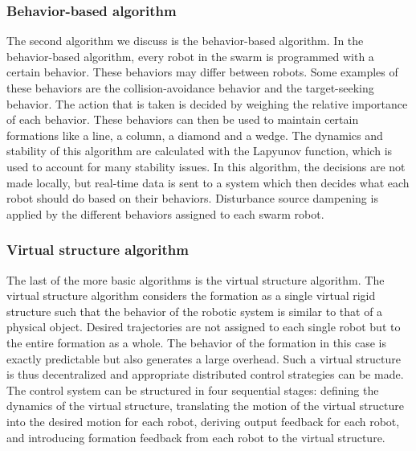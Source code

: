 \subsubsection{Behavior-based algorithm}
The second algorithm we discuss is the behavior-based algorithm. 
In the behavior-based algorithm, every robot in the swarm is programmed with a certain behavior. 
These behaviors may differ between robots.
Some examples of these behaviors are the collision-avoidance behavior and the target-seeking behavior. 
The action that is taken is decided by weighing the relative importance of each behavior. \cite{consolini2008leader}
These behaviors can then be used to maintain certain formations like a line, a column, a diamond and a wedge. \cite{balch1998behavior}
The dynamics and stability of this algorithm are calculated with the Lapyunov function, which is used to account for many stability issues. \cite{lawton2003decentralized}
In this algorithm, the decisions are not made locally, but real-time data is sent to a system which then decides what each robot should do based on their behaviors.
Disturbance source dampening is applied by the different behaviors assigned to each swarm robot.

\subsubsection{Virtual structure algorithm}
The last of the more basic algorithms is the virtual structure algorithm. 
The virtual structure algorithm considers the formation as a single virtual rigid structure such that the behavior of the robotic system is similar to that of a physical object. 
Desired trajectories are not assigned to each single robot but to the entire formation as a whole. 
The behavior of the formation in this case is exactly predictable but also generates a  large overhead. \cite{consolini2008leader}
Such a virtual structure is thus decentralized and appropriate distributed control strategies can be made. \cite{ren2004decentralized}
The control system can be structured in four sequential stages: defining the dynamics of the virtual structure, 
translating the motion of the virtual structure into the desired motion for each robot, 
deriving output feedback for each robot,
and introducing formation feedback from each robot to the virtual structure. \cite{do2007nonlinear} 

